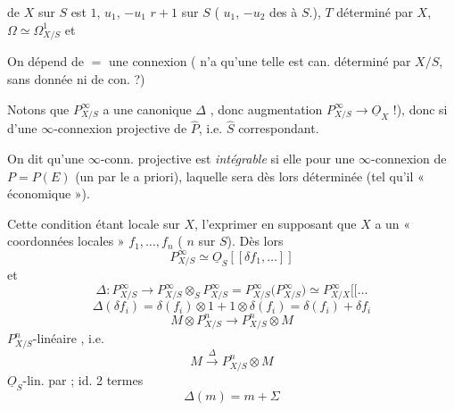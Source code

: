 \documentclass[11pt,a4paper]{article}
\begin{document}
\ill{} de $X$ sur $S$ est $1$, \struck{\ill{}} \ill{} $u_1$, $-u_1$ \ill{}
$r+1$ \ill{} sur $S$ (\ill{} $u_1$, $-u_2$ \ill{} des \ill{} à $S$.),
 $T$ \ill{} déterminé par $X$, \ill{}
$\Omega \simeq \Omega^1_{X/S}$ et \ill{}

On dépend de \ill{} $=$ une \ill{} connexion (\ill{} n'a qu'une telle \ill{}
est can. déterminé par $X/S$, sans \ill{} donnée ni de con. ?)

Notons que $P^{\infty}_{X/S}$ a une  \ill{} canonique $\Delta$
\ill{}, donc \ill{} augmentation $P^{\infty}_{X/S} \to \underline{O}_X$ !),
donc si \ill{} d'une $\infty$-connexion projective \ill{} de $\widehat{P}$,
i.e. $\widehat{S}$ \ill{} \struck{\ill{}} correspondant.

On dit \ill{} qu'une $\infty$-conn. projective est \emph{intégrable} si elle
\ill{} pour une $\infty$-connexion \ill{} de $P = P(E)$ (un \ill{} par le
\ill{} a priori), laquelle sera dès lors \ill{} déterminée (tel qu'il \ill{}
« économique »).

Cette condition étant locale sur $X$, \ill{} l'exprimer en supposant que $X$
a \ill{} un \ill{} « coordonnées locales » $f_1, \ldots, f_n$ (\ill{} $n$ sur
$S$). Dès lors
\[
  P^{\infty}_{X/S} \simeq \underline{O}_S[[\delta f_1, \ldots]]
\]
et
\[
  \Delta : P^{\infty}_{X/S} \longrightarrow
  P^{\infty}_{X/S} \otimes_S P^{\infty}_{X/S}
  = P^{\infty}_{X/S}\big( P^{\infty}_{X/S} \big)
  \simeq P^{\infty}_{X/X}[[\ldots
\]
\[
  \Delta(\delta f_i) = \delta(f_i) \otimes 1 + 1 \otimes \delta(f_i)
  = \delta(f_i) + \delta f_i
\]
\[
  M \otimes P^n_{X/S} \longrightarrow P^n_{X/S} \otimes M
\]
\struck{\ill{}} $P^n_{X/S}$-linéaire \ill{}, i.e.
\[
  M \xrightarrow{\;\Delta\;} P^n_{X/S} \otimes M
\]
\ill{} $\underline{O}_S$-lin. par \ill{} ; id. \ill{} 2 termes
 \ill{}
\[
  \Delta(m) = m + \Sigma
\]

\end{document}
